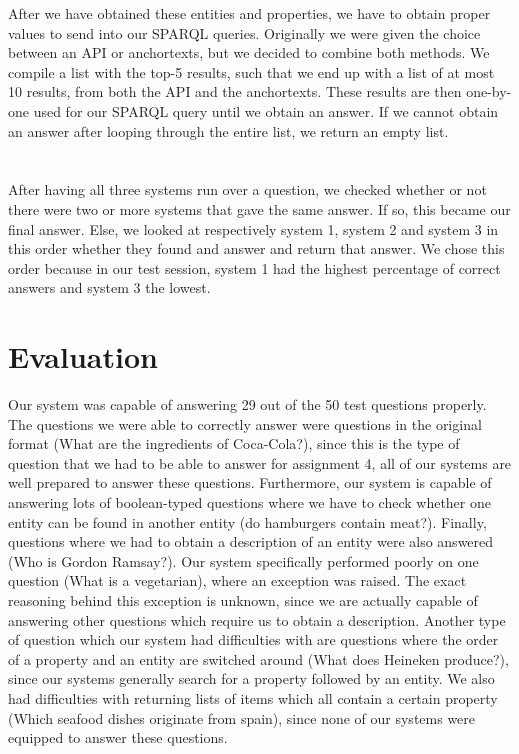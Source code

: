 \documentclass{article}
\begin{document}
After we have obtained these entities and properties, we have to obtain proper values to send into our SPARQL queries. Originally we were given the choice between an API or anchortexts, but we decided to combine both methods. We compile a list with the top-5 results, such that we end up with a list of at most 10 results, from both the API and the anchortexts. These results are then one-by-one used for our SPARQL query until we obtain an answer. If we cannot obtain an answer after looping through the entire list, we return an empty list.\\
\\
\\
After having all three systems run over a question, we checked whether or not there were two or more systems that gave the same answer. If so, this became our final answer. Else, we looked at respectively system 1, system 2 and system 3 in this order whether they found and answer and return that answer. We chose this order because in our test session, system 1 had the highest percentage of correct answers and system 3 the lowest.  

\section{Evaluation}
Our system was capable of answering 29 out of the 50 test questions properly. The questions we were able to correctly answer were questions in the original format (What are the ingredients of Coca-Cola?), since this is the type of question that we had to be able to answer for assignment 4, all of our systems are well prepared to answer these questions. Furthermore, our system is capable of answering lots of boolean-typed questions where we have to check whether one entity can be found in another entity (do hamburgers contain meat?). Finally, questions where we had to obtain a description of an entity were also answered (Who is Gordon Ramsay?). Our system specifically performed poorly on one question (What is a vegetarian), where an exception was raised. The exact reasoning behind this exception is unknown, since we are actually capable of answering other questions which require us to obtain a description.
Another type of question which our system had difficulties with are questions where the order of a property and an entity are switched around (What does Heineken produce?), since our systems generally search for a property followed by an entity.
We also had difficulties with returning lists of items which all contain a certain property (Which seafood dishes originate from spain), since none of our systems were equipped to answer these questions.
\end{document}
